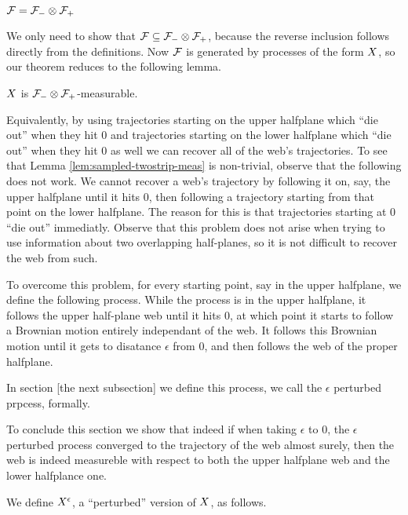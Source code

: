 {\begin{theorem}
  $\mathcal{F} = \mathcal{F}_{-} \otimes \mathcal{F}_{+}$
\end{theorem}

We only need to show that $\mathcal{F} \subseteq \mathcal{F}_{-} \otimes \mathcal{F}_{+}$,
because the reverse inclusion follows directly from the definitions.
Now $\mathcal{F}$ is generated by processes of the form $X$,
so our theorem reduces to the following lemma.

\begin{lemma}
  \label{lem:sampled-twostrip-meas}
  $X$ is $\mathcal{F}_{-} \otimes \mathcal{F}_{+}$-measurable.
\end{lemma}

Equivalently, by using trajectories starting on the upper halfplane
which  ``die out'' when they hit $0$ and trajectories starting on
the lower halfplane which ``die out'' when they hit $0$ as well we
can recover all of the web's trajectories.
To see that Lemma \ref{lem:sampled-twostrip-meas} is non-trivial,
observe that the following does not work. We cannot recover a web's
trajectory by following it on, say, the upper halfplane until it
hits 0, then following a trajectory starting from that point on the
lower halfplane. The reason for this is that trajectories starting at
0 ``die out'' immediatly. Observe that this problem does not arise when
trying to use information about two overlapping half-planes, so it is
not difficult to recover the web from such.

To overcome this problem, for every starting point, say in the upper
halfplane, we define the following process. While the process is in
the upper halfplane, it follows the upper half-plane web until it hits
$0$, at which point it starts to follow a Brownian motion entirely
independant of the web. It follows this Brownian motion until it gets
to disatance $\epsilon$ from 0, and then follows the web of the proper
halfplane.

In section [the next subsection] we define this process, we call the
$\epsilon$ perturbed prpcess, formally.

To conclude this section we show that indeed if when taking $\epsilon$
to 0, the $\epsilon$ perturbed process converged to the trajectory of
the web almost surely, then the web is indeed measureble with respect
to both the upper halfplane web and the lower halfplance one.
{
\newcommand{\joinernoargs}{\psi}
\newcommand{\joiner}[2]{\joinernoargs_{{#1}{#2}}}
\newcommand{\joinerval}[1]{\joinernoargs_{#1}}
\begin{definition}
  \label{def:resamplede}
  We define $X^{\epsilon}$, a ``perturbed'' version of $X$, as
  follows.


\end{definition}}}
